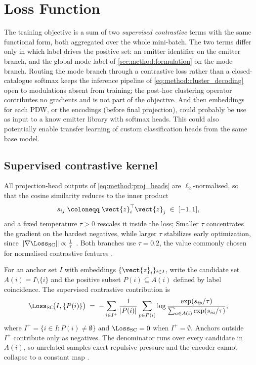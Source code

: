 \section{Loss Function}\label{sec:method:loss}

The training objective is a sum of two \emph{supervised contrastive} \parencite{khosla2020supcon} terms with the same functional form, both aggregated over the whole mini-batch.
The two terms differ only in which label drives the positive set: an emitter identifier on the emitter branch, and the global mode label of \cref{sec:method:formulation} on the mode branch.
Routing the mode branch through a contrastive loss rather than a closed-catalogue softmax keeps the inference pipeline of \cref{eq:method:cluster_decoding} open to modulations absent from training; the post-hoc clustering operator contributes no gradients and is not part of the objective. And then embeddings for each PDW, or the encodings (before final projection), could probably be use as input to a know emitter library with softmax heads. This could also potentially enable transfer learning of custom classification heads from the same base model.

\subsection*{Supervised contrastive kernel}

All projection-head outputs of \cref{eq:method:proj_heads} are $\ell_2$-normalised, so that the cosine similarity reduces to the inner product
\begin{equation}\label{eq:method:sim}
  s_{ij} \;\coloneqq\; \vect{z}_i^{\top}\vect{z}_j \;\in\; [-1,1],
\end{equation}
and a fixed temperature $\tau > 0$ rescales it inside the loss;
Smaller $\tau$ concentrates the gradient on the hardest negatives, while larger $\tau$ stabilizes early optimization, since $\|\nabla \Loss_{\mathrm{SC}}\| \propto \frac{1}{\tau}$
\parencite{khosla2020supcon}.
Both branches use $\tau = 0.2$, the value commonly chosen for normalised contrastive features \parencite{chen2020simclr,khosla2020supcon}.

For an anchor set $I$ with embeddings $\{\vect{z}_i\}_{i \in I}$, write the candidate set $A(i) = I \setminus \{i\}$ and the positive subset $P(i) \subseteq A(i)$ defined by label coincidence.
The supervised contrastive contribution \parencite{khosla2020supcon} is
\begin{equation}\label{eq:method:supcon}
  \Loss_{\mathrm{SC}}\!\bigl(I, \{P(i)\}\bigr)
  \;=\;
  -\sum_{i \in I^{+}} \frac{1}{\lvert P(i) \rvert}
  \sum_{p \in P(i)}
  \log \frac{\exp(s_{ip}/\tau)}{\sum_{a \in A(i)} \exp(s_{ia}/\tau)},
\end{equation}
where $I^{+} = \{i \in I : P(i) \neq \emptyset\}$ and $\Loss_{\mathrm{SC}} = 0$ when $I^{+} = \emptyset$.
Anchors outside $I^{+}$ contribute only as negatives.
The denominator runs over every candidate in $A(i)$, so unrelated samples exert repulsive pressure and the encoder cannot collapse to a constant map \parencite{chen2020simclr}.


